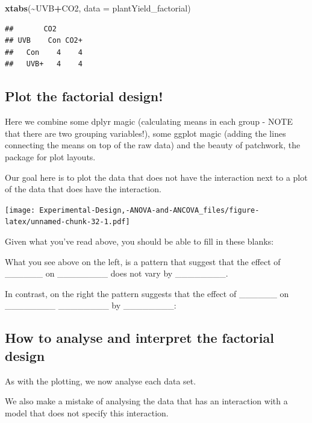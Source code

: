 \documentclass[
]{book}
\newenvironment{Shaded}{\begin{snugshade}}{\end{snugshade}}
\newcommand{\AttributeTok}[1]{\textcolor[rgb]{0.13,0.29,0.53}{#1}}
\newcommand{\FunctionTok}[1]{\textcolor[rgb]{0.13,0.29,0.53}{\textbf{#1}}}
\newcommand{\NormalTok}[1]{#1}
\newcommand{\SpecialCharTok}[1]{\textcolor[rgb]{0.81,0.36,0.00}{\textbf{#1}}}
\begin{document}
\begin{Shaded}
\begin{Highlighting}[]
\FunctionTok{xtabs}\NormalTok{(}\SpecialCharTok{\textasciitilde{}}\NormalTok{UVB}\SpecialCharTok{+}\NormalTok{CO2, }\AttributeTok{data =}\NormalTok{ plantYield\_factorial)}
\end{Highlighting}
\end{Shaded}

\begin{verbatim}
##       CO2
## UVB    Con CO2+
##   Con    4    4
##   UVB+   4    4
\end{verbatim}

\hypertarget{plot-the-factorial-design}{%
\subsection{Plot the factorial design!}\label{plot-the-factorial-design}}

Here we combine some dplyr magic (calculating means in each group - NOTE that there are two grouping variables!), some ggplot magic (adding the lines connecting the means on top of the raw data) and the beauty of patchwork, the package for plot layouts.

Our goal here is to plot the data that does not have the interaction next to a plot of the data that does have the interaction.

\texttt{[image: Experimental-Design,-ANOVA-and-ANCOVA\_files/figure-latex/unnamed-chunk-32-1.pdf]}

Given what you've read above, you should be able to fill in these blanks:

What you see above on the left, is a pattern that suggest that the effect of \_\_\_\_\_\_ on \_\_\_\_\_\_\_\_ does not vary by \_\_\_\_\_\_\_\_.

In contrast, on the right the pattern suggests that the effect of \_\_\_\_\_\_ on \_\_\_\_\_\_\_\_ \_\_\_\_\_\_\_\_ by \_\_\_\_\_\_\_\_:

\hypertarget{how-to-analyse-and-interpret-the-factorial-design}{%
\subsection{How to analyse and interpret the factorial design}\label{how-to-analyse-and-interpret-the-factorial-design}}

As with the plotting, we now analyse each data set.

We also make a mistake of analysing the data that has an interaction with a model that does not specify this interaction.
\end{document}
